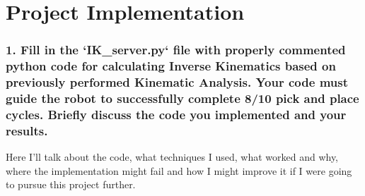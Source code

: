 \documentclass{article}
\begin{document}
\section{Project Implementation}

\subsubsection{1. Fill in the `IK\_server.py` file with properly commented python code for calculating Inverse Kinematics based on previously performed Kinematic Analysis. Your code must guide the robot to successfully complete 8/10 pick and place cycles. Briefly discuss the code you implemented and your results.}


Here I'll talk about the code, what techniques I used, what worked and why, where the implementation might fail and how I might improve it if I were going to pursue this project further.  
\end{document}
